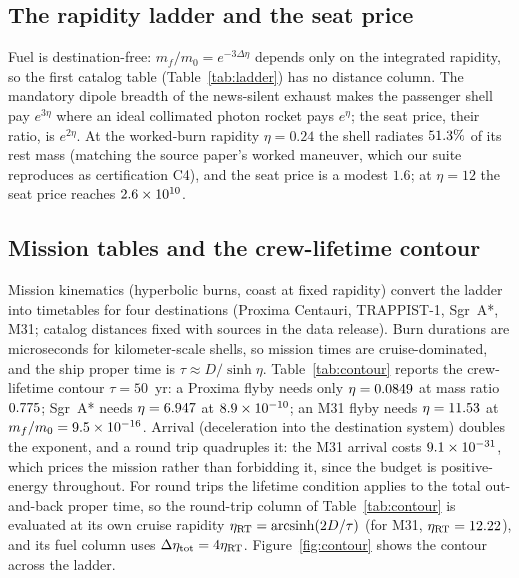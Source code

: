 \documentclass[11pt]{article}
\begin{document}
\subsection{The rapidity ladder and the seat price}

Fuel is destination-free: $m_f/m_0 = e^{-3\Delta\eta}$ depends only on the
integrated rapidity, so the first catalog table (Table~\ref{tab:ladder})
has no distance column. The mandatory dipole breadth of the news-silent
exhaust makes the passenger shell pay $e^{3\eta}$ where an ideal
collimated photon rocket pays $e^{\eta}$; the seat price, their ratio, is
$e^{2\eta}$. At the worked-burn rapidity $\eta = 0.24$ the shell radiates
$51.3\%$ of its rest mass (matching the source paper's worked
maneuver, which our suite reproduces as certification C4), and the seat
price is a modest $1.6$; at $\eta = 12$ the seat price reaches
$2.6\times10^{10}$.

\begin{table}[t]
\centering
\caption{Rapidity ladder (destination-free, all [R]). The $1-\beta$
column resolves the approach to light speed where $\beta$ saturates the
displayed digits; the seat price is the initial-mass ratio relative to an
ideal collimated photon rocket.}
\label{tab:ladder}

\end{table}

\subsection{Mission tables and the crew-lifetime contour}

Mission kinematics (hyperbolic burns, coast at fixed rapidity) convert the
ladder into timetables for four destinations (Proxima Centauri,
TRAPPIST-1, Sgr~A*, M31; catalog distances fixed with sources in the data
release). Burn durations are microseconds for kilometer-scale shells, so
mission times are cruise-dominated, and the ship proper time is
$\tau \approx D/\sinh\eta$. Table~\ref{tab:contour} reports the
crew-lifetime contour $\tau = 50$~yr: a Proxima flyby needs only
$\eta = 0.0849$ at mass ratio $0.775$; Sgr~A* needs
$\eta = 6.947$ at $8.9\times10^{-10}$; an M31 flyby needs $\eta = 11.53$ at
$m_f/m_0 = 9.5\times10^{-16}$. Arrival (deceleration into the destination system)
doubles the exponent, and a round trip quadruples it: the M31 arrival
costs $9.1\times10^{-31}$, which prices the mission rather than forbidding it,
since the budget is positive-energy throughout. For round trips the
lifetime condition applies to the total out-and-back proper time, so the
round-trip column of Table~\ref{tab:contour} is evaluated at its own
cruise rapidity $\eta_{\rm RT} = {\rm arcsinh}(2D/\tau)$ (for M31,
$\eta_{\rm RT} = 12.22$), and its fuel column uses $\Delta\eta_{\rm
tot} = 4\eta_{\rm RT}$. Figure~\ref{fig:contour} shows the contour across
the ladder.
\end{document}
